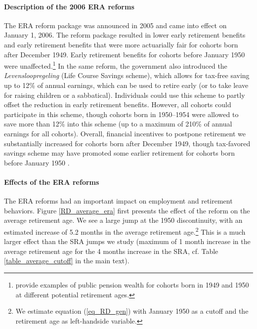 \documentclass[12pt,a4paper]{article}
\begin{document}
\paragraph{Description of the 2006 ERA reforms} The ERA reform package was announced in 2005 and came into effect on January 1, 2006. The reform package resulted in lower early retirement benefits and early retirement benefits that were more actuarially fair for cohorts born after December 1949. Early retirement benefits for cohorts before January 1950 were unaffected.\footnote{\cite{lindeboom_montizaan_2020} provide examples of public pension wealth for cohorts born in 1949 and 1950 at different potential retirement ages.} In the same reform, the government also introduced the \textit{Levensloopregeling} (Life Course Savings scheme), which allows for tax-free saving up to 12\% of annual earnings, which can be used to retire early (or to take leave for raising children or a sabbatical). Individuals could use this scheme to partly offset the reduction in early retirement benefits. However, all cohorts could participate in this scheme, though cohorts born in 1950--1954 were allowed to save more than 12\% into this scheme (up to a maximum of 210\% of annual earnings for all cohorts). Overall, financial incentives to postpone retirement we substantially increased for cohorts born after December 1949, though tax-favored savings scheme may have promoted some earlier retirement for cohorts born before January 1950 \citep[see also][]{lindeboom_montizaan_2020}.  

\paragraph{Effects of the ERA reforms}

The ERA reforms had an important impact on employment and retirement behaviors. Figure \ref{RD_average_era} first presents the effect of the reform on the average retirement age. We see a large jump at the 1950 discontinuity, with an estimated increase of 5.2 months in the average retirement age.\footnote{We estimate equation (\ref{eq_RD_gen}) with January 1950 as a cutoff and the retirement age as left-handside variable.} This is a much larger effect than the SRA jumps we study (maximum of 1 month increase in the average retirement age for the 4 months increase in the SRA, cf. Table \ref{table_average_cutoff} in the main text).  
\end{document}
